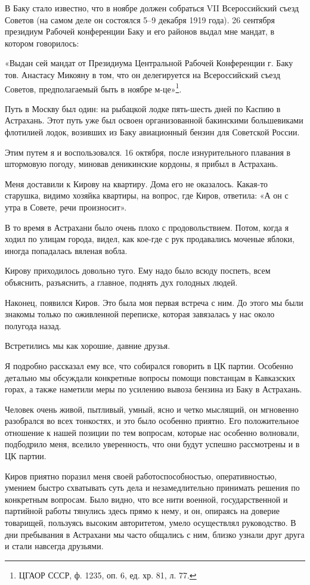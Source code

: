 \documentclass[12pt, a4paper, openany]{book}
\begin{document}
В Баку стало известно, что в ноябре должен собраться VII Всероссийский съезд Советов (на самом деле он состоялся 5–9 декабря 1919 года). 26 сентября президиум Рабочей конференции Баку и его районов выдал мне мандат, в котором говорилось:

«Выдан сей мандат от Президиума Центральной Рабочей Конференции г. Баку тов. Анастасу Микояну в том, что он делегируется на Всероссийский съезд Советов, предполагаемый быть в ноябре м-це»\footnote{ЦГАОР СССР, ф. 1235, оп. 6, ед. хр. 81, л. 77.}.

Путь в Москву был один: на рыбацкой лодке пять-шесть дней по Каспию в Астрахань. Этот путь уже был освоен организованной бакинскими большевиками флотилией лодок, возивших из Баку авиационный бензин для Советской России.

Этим путем я и воспользовался. 16 октября, после изнурительного плавания в штормовую погоду, миновав деникинские кордоны, я прибыл в Астрахань.

Меня доставили к Кирову на квартиру. Дома его не оказалось. Какая-то старушка, видимо хозяйка квартиры, на вопрос, где Киров, ответила: «А он с утра в Совете, речи произносит».

В то время в Астрахани было очень плохо с продовольствием. Потом, когда я ходил по улицам города, видел, как кое-где с рук продавались моченые яблоки, иногда попадалась вяленая вобла.

Кирову приходилось довольно туго. Ему надо было всюду поспеть, всем объяснить, разъяснить, а главное, поднять дух голодных людей.

Наконец, появился Киров. Это была моя первая встреча с ним. До этого мы были знакомы только по оживленной переписке, которая завязалась у нас около полугода назад.

Встретились мы как хорошие, давние друзья.

Я подробно рассказал ему все, что собирался говорить в ЦК партии. Особенно детально мы обсуждали конкретные вопросы помощи повстанцам в Кавказских горах, а также наметили меры по усилению вывоза бензина из Баку в Астрахань.

Человек очень живой, пытливый, умный, ясно и четко мыслящий, он мгновенно разобрался во всех тонкостях, и это было особенно приятно. Его положительное отношение к нашей позиции по тем вопросам, которые нас особенно волновали, подбодрило меня, вселило уверенность, что они будут успешно рассмотрены и в ЦК партии.

Киров приятно поразил меня своей работоспособностью, оперативностью, умением быстро схватывать суть дела и незамедлительно принимать решения по конкретным вопросам. Было видно, что все нити военной, государственной и партийной работы тянулись здесь прямо к нему, и он, опираясь на доверие товарищей, пользуясь высоким авторитетом, умело осуществлял руководство. В дни пребывания в Астрахани мы часто общались с ним, близко узнали друг друга и стали навсегда друзьями.
\end{document}
